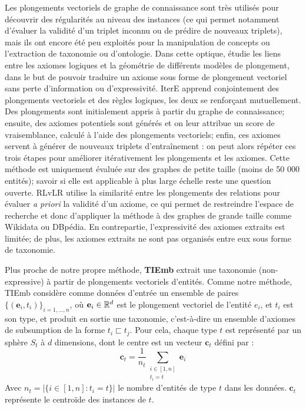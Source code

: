 Les plongements vectoriels de graphe de connaissance sont très utilisés pour découvrir des régularités au niveau des instances (ce qui permet notamment d'évaluer la validité d'un triplet inconnu ou de prédire de nouveaux triplets), mais ils ont encore été peu exploités pour la manipulation de concepts ou l'extraction de taxonomie ou d'ontologie. Dans cette optique, \cite{gutierrez2018knowledge} étudie les liens entre les axiomes logiques et la géométrie de différents modèles de plongement, dans le but de pouvoir traduire un axiome sous forme de plongement vectoriel sans perte d'information ou d'expressivité. IterE \cite{zhang2019iteratively} apprend conjointement des plongements vectoriels et des règles logiques, les deux se renforçant mutuellement. Des plongements sont initialement appris à partir du graphe de connaissance; ensuite, des axiomes potentiels sont générés et on leur attribue un score de vraisemblance, calculé à l'aide des plongements vectoriels; enfin, ces axiomes servent à générer de nouveaux triplets d'entraînement : on peut alors répéter ces trois étapes pour améliorer itérativement les plongements et les axiomes. Cette méthode est uniquement évaluée sur des graphes de petite taille (moins de 50 000 entités); savoir si elle est applicable à plus large échelle reste une question ouverte. RLvLR \cite{omran2018scalable} utilise la similarité entre les plongements des relations pour évaluer \textit{a priori} la validité d'un axiome, ce qui permet de restreindre l'espace de recherche et donc d'appliquer la méthode à des graphes de grande taille comme Wikidata ou DBpédia. En contrepartie, l'expressivité des axiomes extraits est limitée; de plus, les axiomes extraits ne sont pas organisés entre eux sous forme de taxonomie.


\label{subsec:litt-tiemb}


Plus proche de notre propre méthode, \textbf{TIEmb} \cite{ristoski2017large} extrait une taxonomie (non-expressive) à partir de plongements vectoriels d'entités. Comme notre méthode, TIEmb considère comme données d'entrée un ensemble de paires $\{(\textbf{e}_i, t_i) \}_{i=1, \ldots, n}$, où $\textbf{e}_i \in \mathbb{R}^d$ est le plongement vectoriel de l'entité $e_i$, et $t_i$ est son type, et produit en sortie une taxonomie, c'est-à-dire un ensemble d'axiomes de subsumption de la forme $t_i \sqsubset t_j$. Pour cela, chaque type $t$ est représenté par un sphère $S_t$ à $d$ dimensions, dont le centre est un vecteur $\textbf{c}_t$ défini par :
\begin{equation}
 \textbf{c}_t = \frac{1}{n_t} \sum_{\substack{i \in [1, n] \\ t_i = t}} \textbf{e}_i
\end{equation}
Avec $n_t = |\{ i \in [1, n] : t_i = t \}|$ le nombre d'entités de type $t$ dans les données. $\textbf{c}_t$ représente le centroïde des instances de $t$.

